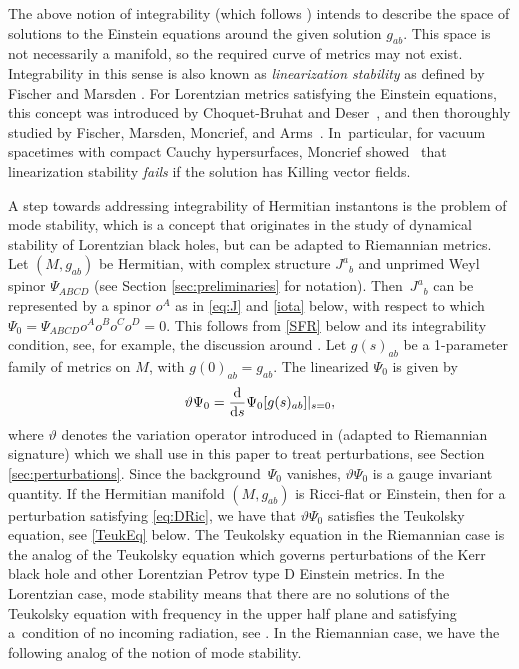 \documentclass[10pt,a4paper]{amsart}
\numberwithin{equation}{section}
\begin{document}
The above notion of integrability (which follows \cite[Section 12.E]{MR2371700}) intends to describe the space of solutions to the Einstein equations around the given solution $g_{ab}$. This space is not necessarily a manifold, so the required curve of metrics may not exist. Integrability in this sense is also known as {\em linearization stability} as defined by Fischer and Marsden \cite{fischer_marsden_1975}. For Lorentzian metrics satisfying the Einstein equations, this concept was introduced by Choquet-Bruhat and Deser~\cite{CHOQUETBRUHAT1973165}, and then thoroughly studied by Fischer, Marsden, Moncrief, and Arms~\mbox{\cite{ARMS198281,Fischer1980, fischer_marsden_1973, Moncrief1, Moncrief2}}. In~particular, for vacuum spacetimes with compact Cauchy hypersurfaces, Moncrief showed~\mbox{\cite{Moncrief1, Moncrief2}} that linearization stability {\em fails} if the solution has Killing vector fields.

A step towards addressing integrability of Hermitian instantons is the problem of mode stability, which is a concept that originates in the study of dynamical stability of Lorentzian black holes, but can be adapted to Riemannian metrics.
Let $(M, g_{ab})$ be Hermitian,
with complex structure $J^{a}{}_{b}$ and unprimed Weyl spinor $\Psi_{ABCD}$ (see Section \ref{sec:preliminaries} for notation).
Then~$J^{a}{}_{b}$ can be represented by a spinor $o^A$ as in \eqref{eq:J} and \eqref{iota} below, with respect to which $\Psi_0=\Psi_{ABCD}o^{A}o^{B}o^{C}o^{D}=0$. This follows from \eqref{SFR} below and its integrability condition, see, for example, the discussion around \cite[equation (12.3)]{Huggett_Tod_1994}.
Let $g(s)_{ab}$ be a 1-parameter family of
metrics on $M$, with $g(0)_{ab} = g_{ab}$.
The linearized $\Psi_0$ is given by
\begin{align} \label{eq:LinPsi0}
\vartheta \Psi_0 = \frac{{\rm d}}{{\rm d}s} \Psi_0[g(s)_{ab}] |_{s=0},
\end{align}
where $\vartheta$ denotes the variation operator introduced in \cite{backdahl2016formalism} (adapted to Riemannian signature) which we shall use in this paper to treat perturbations, see Section \ref{sec:perturbations}. Since the background~$\Psi_0$ vanishes, $\vartheta \Psi_0$ is a gauge invariant quantity.
If the Hermitian manifold $(M,g_{ab})$ is Ricci-flat or Einstein, then for a perturbation satisfying \eqref{eq:DRic}, we have that $\vartheta \Psi_0$ satisfies the Teukolsky equation, see \eqref{TeukEq} below.
The Teukolsky equation in the Riemannian case is the analog of the Teukolsky equation which governs perturbations of the Kerr black hole and other Lorentzian Petrov type D Einstein metrics.
In the Lorentzian case, mode stability means that there are no solutions of the Teukolsky equation with frequency in the upper half plane and satisfying a~condition of no incoming radiation, see \cite{Andersson2016, Whiting}.
In the Riemannian case, we have the following analog of the notion of mode stability.
\end{document}
